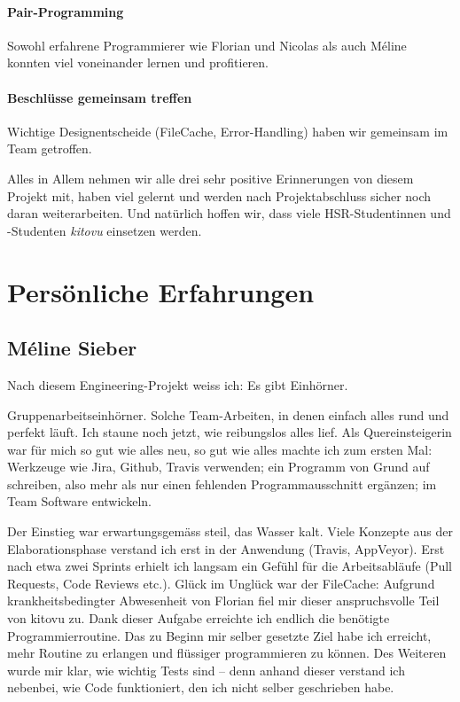 \documentclass[a4paper]{article}
\let\oldsection\section
\renewcommand\section{\clearpage\oldsection}
\begin{document}
\paragraph{Pair-Programming}
 Sowohl erfahrene Programmierer wie Florian und Nicolas als auch Méline konnten viel voneinander lernen und profitieren.
\paragraph{Beschlüsse gemeinsam treffen}
 Wichtige Designentscheide (FileCache, Error-Handling) haben wir gemeinsam im Team getroffen.

Alles in Allem nehmen wir alle drei sehr positive Erinnerungen von diesem Projekt mit, haben viel gelernt und werden nach Projektabschluss sicher noch daran weiterarbeiten. Und natürlich hoffen wir, dass viele HSR-Studentinnen und -Studenten \emph{kitovu} einsetzen werden.

  \section{Persönliche Erfahrungen}

  \subsection{Méline Sieber}

Nach diesem Engineering-Projekt weiss ich: Es gibt Einhörner.

Gruppenarbeitseinhörner. Solche Team-Arbeiten, in denen einfach alles rund und perfekt läuft. Ich staune noch jetzt, wie reibungslos alles lief. Als Quereinsteigerin war für mich so gut wie alles neu, so gut wie alles machte ich zum ersten Mal: Werkzeuge wie Jira, Github, Travis verwenden; ein Programm von Grund auf schreiben, also mehr als nur einen fehlenden Programmausschnitt ergänzen; im Team Software entwickeln.

Der Einstieg war erwartungsgemäss steil, das Wasser kalt. Viele Konzepte aus der Elaborationsphase verstand ich erst in der Anwendung (Travis, AppVeyor). Erst nach etwa zwei Sprints erhielt ich langsam ein Gefühl für die Arbeitsabläufe (Pull Requests, Code Reviews etc.). Glück im Unglück war der FileCache: Aufgrund krankheitsbedingter Abwesenheit von Florian fiel mir dieser anspruchsvolle Teil von kitovu zu. Dank dieser Aufgabe erreichte ich endlich die benötigte Programmierroutine. Das zu Beginn mir selber gesetzte Ziel habe ich erreicht, mehr Routine zu erlangen und flüssiger programmieren zu können. Des Weiteren wurde mir klar, wie wichtig Tests sind -- denn anhand dieser verstand ich nebenbei, wie Code funktioniert, den ich nicht selber geschrieben habe.
\end{document}
